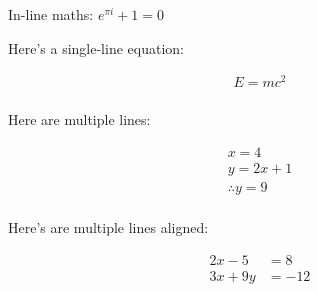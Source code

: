 \documentclass[10pt]{extarticle}
\date{}
\begin{document}

In-line maths: $e^{\pi i} + 1 = 0$

Here's a single-line equation:

\begin{align*}
E = mc^2 \\
\end{align*}

Here are multiple lines:

\begin{align*}
x = 4 \\
y = 2x + 1 \\
\therefore y = 9 \\
\end{align*}

Here's are multiple lines aligned:

\begin{align*}
2x - 5 &= 8 \\
3x + 9y &= -12 \\
\end{align*}

\end{document}
